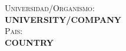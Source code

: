 
\newcommand{\estancia}[2]{
\cleardoublepage 
\vspace*{10cm}
\textsc{Universidad/Organismo}:\\
\uppercase{\textbf{#1}}\\[5pt]
\bigskip
\textsc{Pais}:\\
\uppercase{\textbf{#2}}\\
\cleardoublepage
}

\estancia{University/Company}{Country}

\cleardoublepage



